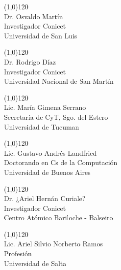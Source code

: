 \documentclass[a4paper,11pt]{article}
\begin{document}
 \vspace{1.1cm}


 \begin{paracol}{3}

  \scriptsize

\noindent\line(1,0){120}\\
Dr. Osvaldo Martín \\
Investigador Conicet \\
Universidad de San Luis


 \switchcolumn

\noindent\line(1,0){120}\\
Dr. Rodrigo Díaz \\
Investigador Conicet \\
Universidad Nacional de San Martín\\

 \switchcolumn

\noindent\line(1,0){120}\\
Lic. María Gimena Serrano \\
Secretaría de CyT, Sgo. del Estero \\
Universidad de Tucuman

 \end{paracol}

 \vspace{1.1cm}


\begin{paracol}{3}

  \scriptsize

\noindent\line(1,0){120}\\
Lic. Gustavo Andrés Landfried \\
Doctorando en Cs de la Computación \\
Universidad de Buenos Aires


 \switchcolumn

\noindent\line(1,0){120}\\
Dr. ¿Ariel Hernán Curiale? \\
Investigador Conicet \\
Centro Atómico Bariloche - Balseiro

 \switchcolumn

\noindent\line(1,0){120}\\
Lic. Ariel Silvio Norberto Ramos\\
Profesión \\
Universidad de Salta

 \end{paracol}
\end{document}
